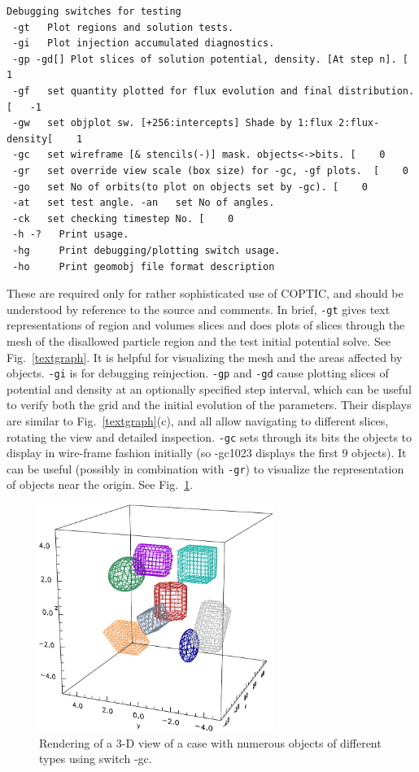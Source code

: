 \documentclass[12pt]{article}
\begin{document}
\begin{verbatim}
Debugging switches for testing
 -gt   Plot regions and solution tests.
 -gi   Plot injection accumulated diagnostics.
 -gp -gd[] Plot slices of solution potential, density. [At step n]. [    1
 -gf   set quantity plotted for flux evolution and final distribution. [   -1
 -gw   set objplot sw. [+256:intercepts] Shade by 1:flux 2:flux-density[    1
 -gc   set wireframe [& stencils(-)] mask. objects<->bits. [    0
 -gr   set override view scale (box size) for -gc, -gf plots.  [    0
 -go   set No of orbits(to plot on objects set by -gc). [    0
 -at   set test angle. -an   set No of angles. 
 -ck   set checking timestep No. [    0
 -h -?   Print usage.
 -hg     Print debugging/plotting switch usage.
 -ho     Print geomobj file format description
\end{verbatim}
These are required only for rather sophisticated use of COPTIC, and
should be understood by reference to the source and comments. In
brief, \verb!-gt! gives text representations of region and volumes
slices and does plots of slices through the mesh of the disallowed
particle region and the test initial potential solve. See Fig.\
\ref{textgraph}. It is helpful for visualizing the mesh and the areas
affected by objects. \verb!-gi! is for debugging
reinjection. \verb!-gp! and \verb!-gd! cause plotting slices of
potential and density at an optionally specified step interval, which
can be useful to verify both the grid and the initial evolution of the
parameters. Their displays are similar to Fig.\ \ref{textgraph}(c),
and all allow navigating to different slices, rotating the view and
detailed inspection. \verb!-gc! sets through its bits the objects to
display in wire-frame fashion initially (so -gc1023 displays the first
9 objects). It can be useful (possibly in combination with \verb!-gr!) to
visualize the representation of objects near the origin. See Fig.\
\ref{manyobj}. 
\begin{figure}[htp]
  \centering
  \includegraphics[width=3in]{manyobj}
  \caption{Rendering of a 3-D view of a case with numerous objects of
    different types using switch -gc.\label{manyobj}}
\end{figure}
\end{document}
